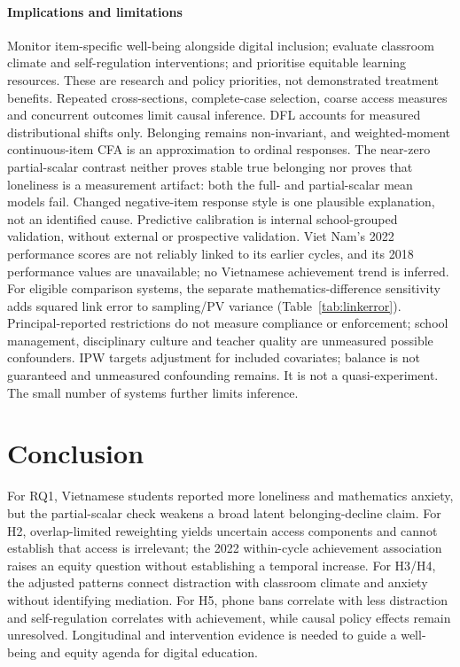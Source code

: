 \documentclass[preprint,12pt,authoryear,nonatbib]{elsarticle}
\begin{document}
\paragraph{Implications and limitations} Monitor item-specific well-being alongside digital inclusion; evaluate classroom climate and self-regulation interventions; and prioritise equitable learning resources. These are research and policy priorities, not demonstrated treatment benefits. Repeated cross-sections, complete-case selection, coarse access measures and concurrent outcomes limit causal inference. DFL accounts for measured distributional shifts only. Belonging remains non-invariant, and weighted-moment continuous-item CFA is an approximation to ordinal responses. The near-zero partial-scalar contrast neither proves stable true belonging nor proves that loneliness is a measurement artifact: both the full- and partial-scalar mean models fail. Changed negative-item response style is one plausible explanation, not an identified cause. Predictive calibration is internal school-grouped validation, without external or prospective validation. Viet Nam's 2022 performance scores are not reliably linked to its earlier cycles, and its 2018 performance values are unavailable; no Vietnamese achievement trend is inferred. For eligible comparison systems, the separate mathematics-difference sensitivity adds squared link error to sampling/PV variance (Table~\ref{tab:linkerror}). Principal-reported restrictions do not measure compliance or enforcement; school management, disciplinary culture and teacher quality are unmeasured possible confounders. IPW targets adjustment for included covariates; balance is not guaranteed and unmeasured confounding remains. It is not a quasi-experiment. The small number of systems further limits inference.

\section{Conclusion}
For RQ1, Vietnamese students reported more loneliness and mathematics anxiety, but the partial-scalar check weakens a broad latent belonging-decline claim. For H2, overlap-limited reweighting yields uncertain access components and cannot establish that access is irrelevant; the 2022 within-cycle achievement association raises an equity question without establishing a temporal increase. For H3/H4, the adjusted patterns connect distraction with classroom climate and anxiety without identifying mediation. For H5, phone bans correlate with less distraction and self-regulation correlates with achievement, while causal policy effects remain unresolved. Longitudinal and intervention evidence is needed to guide a well-being and equity agenda for digital education.
\end{document}
